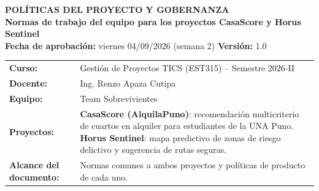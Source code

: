 \documentclass[11pt,a4paper]{article}
\begin{document}

\begin{center}
    {\Large \textbf{\textcolor{AzulUNA}{POLÍTICAS DEL PROYECTO Y GOBERNANZA}}}\\[3pt]
    {\normalsize \textbf{Normas de trabajo del equipo para los proyectos CasaScore y Horus Sentinel}}\\[4pt]
    \footnotesize \textbf{Fecha de aprobación:} viernes 04/09/2026 (semana 2) \quad \textbar\quad \textbf{Versión:} 1.0
\end{center}

\vspace{0.1cm}

\noindent\begin{tabularx}{\textwidth}{@{}P{3.8cm} L@{}}
\toprule
\textbf{Curso:} & Gestión de Proyectos TICS (EST315) -- Semestre 2026-II \\
\textbf{Docente:} & Ing. Renzo Apaza Cutipa \\
\textbf{Equipo:} & Team Sobrevivientes \\
\textbf{Proyectos:} & \textbf{CasaScore (AlquilaPuno)}: recomendación multicriterio de cuartos en alquiler para estudiantes de la UNA Puno. \newline
\textbf{Horus Sentinel}: mapa predictivo de zonas de riesgo delictivo y sugerencia de rutas seguras. \\
\textbf{Alcance del documento:} & Normas comunes a ambos proyectos y políticas de producto de cada uno. \\
\bottomrule
\end{tabularx}

\end{document}
